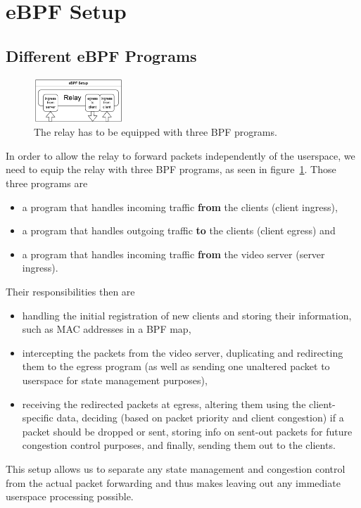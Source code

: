 \section{eBPF Setup}\label{sec:ebpf_setup}
\subsection{Different eBPF Programs}
\begin{figure}[htbp]
    \centering
    \includegraphics[width=0.3\textwidth]{figures/03_fast_relays/ebpf-setup.drawio.pdf}
    \caption[Types of eBPF programs at relay]{The relay has to be equipped with three BPF programs.}\label{fig:ebpf-programs}
\end{figure}

In order to allow the relay to forward packets independently of the userspace, we
need to equip the relay with three BPF programs, as seen in figure~\ref{fig:ebpf-programs}.
Those three programs are 
\begin{itemize}
    \item a program that handles incoming traffic \textbf{from} the clients (client ingress),
    \item a program that handles outgoing traffic \textbf{to} the clients (client egress) and
    \item a program that handles incoming traffic \textbf{from} the video server (server ingress).
\end{itemize}
Their responsibilities then are
\begin{itemize}
    \item handling the initial registration of new clients and storing their information, such as
    MAC addresses in a BPF map,
    \item intercepting the packets from the video server, duplicating and redirecting them to 
    the egress program (as well as sending one unaltered packet to userspace for state
    management purposes),
    \item receiving the redirected packets at egress, altering them using the client-specific
    data, deciding (based on packet priority and client congestion) if a packet should be dropped 
    or sent, storing info on sent-out packets for future congestion control purposes, and finally, sending 
    them out to the clients.
\end{itemize}
This setup allows us to separate any state management and congestion control from the actual
packet forwarding and thus makes leaving out any immediate userspace processing possible.

